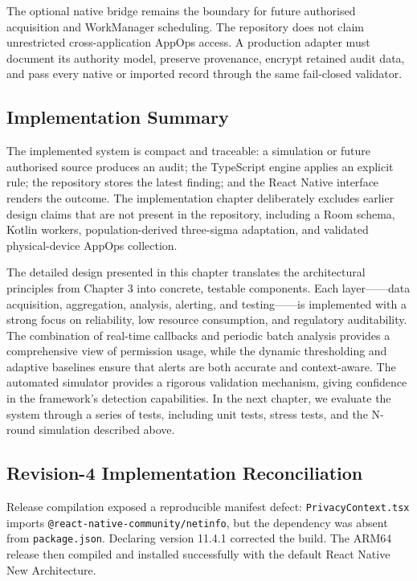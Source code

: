 The optional native bridge remains the boundary for future authorised acquisition and WorkManager scheduling. The repository does not claim unrestricted cross-application AppOps access. A production adapter must document its authority model, preserve provenance, encrypt retained audit data, and pass every native or imported record through the same fail-closed validator.

\subsection{Implementation Summary}

The implemented system is compact and traceable: a simulation or future authorised source produces an audit; the TypeScript engine applies an explicit rule; the repository stores the latest finding; and the React Native interface renders the outcome. The implementation chapter deliberately excludes earlier design claims that are not present in the repository, including a Room schema, Kotlin workers, population-derived three-sigma adaptation, and validated physical-device AppOps collection.

The detailed design presented in this chapter translates the architectural principles from Chapter 3 into concrete, testable components. Each layer——data acquisition, aggregation, analysis, alerting, and testing——is implemented with a strong focus on reliability, low resource consumption, and regulatory auditability. The combination of real-time callbacks and periodic batch analysis provides a comprehensive view of permission usage, while the dynamic thresholding and adaptive baselines ensure that alerts are both accurate and context-aware. The automated simulator provides a rigorous validation mechanism, giving confidence in the framework's detection capabilities. In the next chapter, we evaluate the system through a series of tests, including unit tests, stress tests, and the N-round simulation described above.
\subsection{Revision-4 Implementation Reconciliation}

Release compilation exposed a reproducible manifest defect: \texttt{PrivacyContext.tsx} imports \texttt{@react-native-community/netinfo}, but the dependency was absent from \texttt{package.json}. Declaring version 11.4.1 corrected the build. The ARM64 release then compiled and installed successfully with the default React Native New Architecture.

